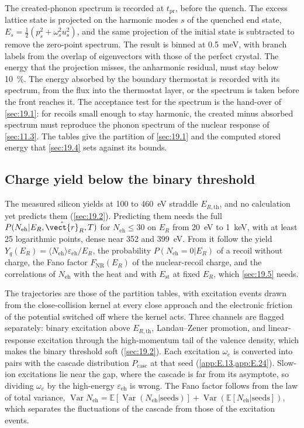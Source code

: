 The created-phonon spectrum is recorded at $t_{\mathrm{pr}}$, before the quench. The excess lattice state is projected on the harmonic modes $s$ of the quenched end state, $E_s = \tfrac12(p_s^2 + \omega_s^2u_s^2)$, and the same projection of the initial state is subtracted to remove the zero-point spectrum. The result is binned at \SI{0.5}{meV}, with branch labels from the overlap of eigenvectors with those of the perfect crystal. The energy that the projection misses, the anharmonic residual, must stay below \SI{10}{\percent}. The energy absorbed by the boundary thermostat is recorded with its spectrum, from the flux into the thermostat layer, or the spectrum is taken before the front reaches it. The acceptance test for the spectrum is the hand-over of \cref{sec:19.1}: for recoils small enough to stay harmonic, the created minus absorbed spectrum must reproduce the phonon spectrum of the nuclear response of \cref{sec:11.3}. The tables give the partition of \cref{sec:19.1} and the computed stored energy that \cref{sec:19.4} sets against its bounds.

\subsection{Charge yield below the binary threshold}

The measured silicon yields at 100 to \SI{460}{eV} straddle $E_{R,\mathrm{th}}$, and no calculation yet predicts them (\cref{sec:19.2}). Predicting them needs the full $P(N_{\mathrm{eh}}|E_R, \hat{\vect{r}}_R, T)$ for $N_{\mathrm{eh}} \le 30$ on $E_R$ from \SI{20}{eV} to \SI{1}{keV}, with at least 25 logarithmic points, dense near 352 and \SI{399}{eV}. From it follow the yield $Y_q(E_R) = \langle N_{\mathrm{eh}}\rangle\varepsilon_{\mathrm{eh}}/E_R$, the probability $P(N_{\mathrm{eh}} = 0|E_R)$ of a recoil without charge, the Fano factor $F_{\mathrm{NR}}(E_R)$ of the nuclear-recoil charge, and the correlations of $N_{\mathrm{eh}}$ with the heat and with $E_{\mathrm{st}}$ at fixed $E_R$, which \cref{sec:19.5} needs.

The trajectories are those of the partition tables, with excitation events drawn from the close-collision kernel at every close approach and the electronic friction of the potential switched off where the kernel acts. Three channels are flagged separately: binary excitation above $E_{R,\mathrm{th}}$, Landau--Zener promotion, and linear-response excitation through the high-momentum tail of the valence density, which makes the binary threshold soft (\cref{sec:19.2}). Each excitation $\omega_e$ is converted into pairs with the cascade distribution $P_{\mathrm{casc}}$ at that seed (\cref{app:E.13,app:E.24}). Slow-ion excitations lie near the gap, where the cascade is far from its asymptote, so dividing $\omega_e$ by the high-energy $\varepsilon_{\mathrm{eh}}$ is wrong. The Fano factor follows from the law of total variance, $\operatorname{Var}N_{\mathrm{eh}} = \mathbb{E}[\operatorname{Var}(N_{\mathrm{eh}}|\text{seeds})] + \operatorname{Var}(\mathbb{E}[N_{\mathrm{eh}}|\text{seeds}])$, which separates the fluctuations of the cascade from those of the excitation events.

